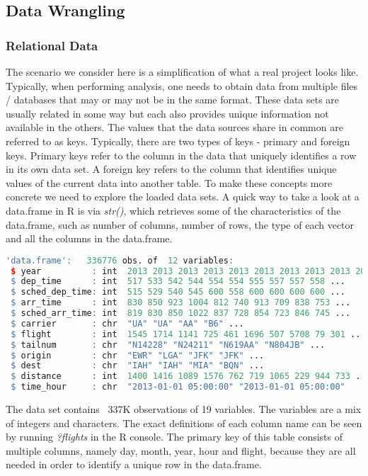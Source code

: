 \subsection{Data Wrangling}
\subsubsection{Relational Data}
The scenario we consider here is a simplification of what a real project looks like. Typically, when performing analysis, one needs to obtain data from multiple files / databases that may or may not be in the same format. These data sets are usually related in some way but each also provides unique information not available in the others. The values that the data sources share in common are referred to as keys. Typically, there are two types of keys - primary and foreign keys. Primary keys refer to the column in the data that uniquely identifies a row in its own data set. A foreign key refers to the column that identifies unique values of the current data into another table. To make these concepts more concrete we need to explore the loaded data sets. A quick way to take a look at a data.frame in R is via \textit{str()}, which retrieves some of the characteristics of the data.frame, such as number of columns, number of rows, the type of each vector and all the columns in the data.frame.
\begin{lstlisting}[language=R]
'data.frame':	336776 obs. of  12 variables:
 $ year          : int  2013 2013 2013 2013 2013 2013 2013 2013 2013 2013 ...
 $ dep_time      : int  517 533 542 544 554 554 555 557 557 558 ...
 $ sched_dep_time: int  515 529 540 545 600 558 600 600 600 600 ...
 $ arr_time      : int  830 850 923 1004 812 740 913 709 838 753 ...
 $ sched_arr_time: int  819 830 850 1022 837 728 854 723 846 745 ...
 $ carrier       : chr  "UA" "UA" "AA" "B6" ...
 $ flight        : int  1545 1714 1141 725 461 1696 507 5708 79 301 ...
 $ tailnum       : chr  "N14228" "N24211" "N619AA" "N804JB" ...
 $ origin        : chr  "EWR" "LGA" "JFK" "JFK" ...
 $ dest          : chr  "IAH" "IAH" "MIA" "BQN" ...
 $ distance      : int  1400 1416 1089 1576 762 719 1065 229 944 733 ...
 $ time_hour     : chr  "2013-01-01 05:00:00" "2013-01-01 05:00:00"
\end{lstlisting}
The data set contains ~337K observations of 19 variables. The variables are a mix of integers and characters. The exact definitions of each column name can be seen by running \textit{?flights} in the R console. The primary key of this table consists of multiple columns, namely day, month, year, hour and flight, because they are all needed in order to identify a unique row in the data.frame.

